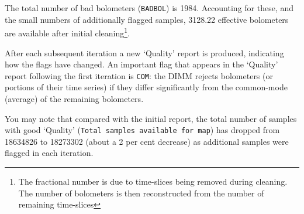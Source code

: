 \documentclass[twoside,11pt]{article}
\renewcommand{\_}{\texttt{\symbol{95}}}
\begin{document}
The total number of bad bolometers (\texttt{BADBOL}) is 1984.
Accounting for these, and the small numbers of additionally flagged
samples, 3128.22 effective bolometers are available after initial
cleaning\footnote{The fractional number is due to time-slices being
removed during cleaning. The number of bolometers is then
reconstructed from the number of remaining time-slices}.

After each subsequent iteration a new `Quality' report is produced,
indicating how the flags have changed. An important flag that appears
in the `Quality' report following the first iteration is \texttt{COM}:
the DIMM rejects bolometers (or portions of their time series) if they
differ significantly from the common-mode (average) of the remaining
bolometers.

You may note that compared with the initial report, the total number of samples
with good `Quality' (\texttt{Total samples available for map}) has
dropped from 18634826 to 18273302 (about a 2 per cent decrease) as
additional samples were flagged in each iteration.
\end{document}
